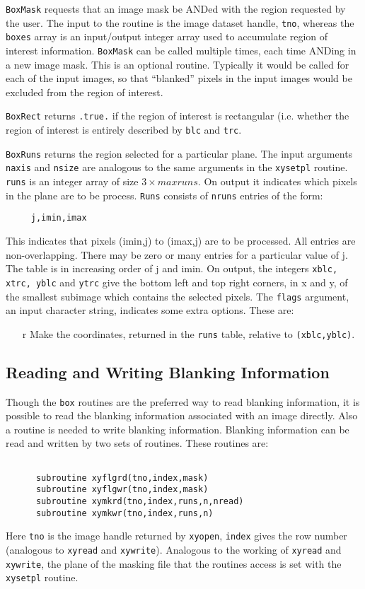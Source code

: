 {\tt BoxMask} requests that an image mask be ANDed with the region
requested by the user. The input to the routine is the image dataset handle,
{\tt tno}, whereas the {\tt boxes} array is an input/output integer array
used to accumulate region of interest information. {\tt BoxMask} can be
called multiple times, each time ANDing in a new image mask. This is an optional
routine. Typically it would be called for each of the input images, so that
``blanked'' pixels in the input images would be excluded from the region of
interest.

{\tt BoxRect} returns {\tt .true.} if the region
of interest is rectangular (i.e. whether the region of interest is entirely
described by {\tt blc} and {\tt trc}.

{\tt BoxRuns} returns the region selected for a particular plane.
The input arguments {\tt naxis} and {\tt nsize} are analogous to the same
arguments in the {\tt xysetpl} routine. {\tt runs} is
an integer array of size $3\times maxruns$. On output it indicates which
pixels in the plane are to be process.
{\tt Runs} consists of {\tt nruns} entries of the form:
\begin{verbatim}
     j,imin,imax
\end{verbatim}
This indicates that pixels (imin,j) to (imax,j) are to be processed.
All entries are non-overlapping.
There may be zero or many  entries for a particular value of j. The
table is in increasing order of j and imin. On output, the integers
{\tt xblc, xtrc, yblc} and {\tt ytrc} give the bottom left and top right
corners, in x and y, of the smallest subimage which contains the selected
pixels.
The {\tt flags} argument, an input character
string, indicates some extra options. These are:
\begin{itemize}
\item[r] Make the coordinates, returned in the {\tt runs} table,
relative to {\tt (xblc,yblc)}.
\end{itemize}

\subsection{Reading and Writing Blanking Information}
Though the {\tt box} routines are the preferred way to read blanking
information, it is possible to read the blanking information associated with
an image directly. Also a routine is needed to write blanking information.
Blanking information can be read and written by two sets of routines.
These routines are:
\begin{verbatim}

      subroutine xyflgrd(tno,index,mask)
      subroutine xyflgwr(tno,index,mask)
      subroutine xymkrd(tno,index,runs,n,nread)
      subroutine xymkwr(tno,index,runs,n)

\end{verbatim}
Here {\tt tno} is the image handle returned by {\tt xyopen}, {\tt index} gives
the row number (analogous to {\tt xyread} and {\tt xywrite}).
Analogous to the working of {\tt xyread} and {\tt xywrite}, the plane of the
masking file that the routines access is set with the {\tt xysetpl} routine.

